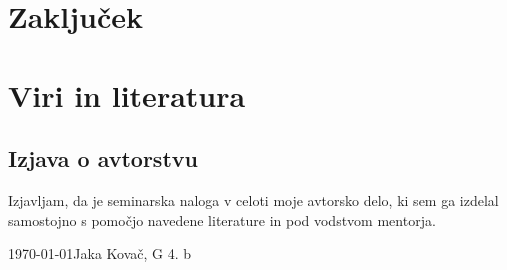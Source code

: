 \documentclass[12pt]{article}
\begin{document}
\newpage
\section{Zaključek}






\newpage
\begingroup
\makeatletter
    \section{Viri in literatura}
    \nocite{*}
    \printbibliography[heading=none]
\makeatother
\endgroup
\newpage

\begin{samepage}
    \thispagestyle{empty}
    \section*{Izjava o avtorstvu}
    Izjavljam, da je seminarska naloga v celoti moje avtorsko delo, ki sem ga 
    izdelal samostojno s pomočjo navedene literature in pod vodstvom mentorja.

    \vfill
    
    \today \hfill Jaka Kovač, G 4. b
    
    \vspace{3 cm}
\end{samepage}
\end{document}
